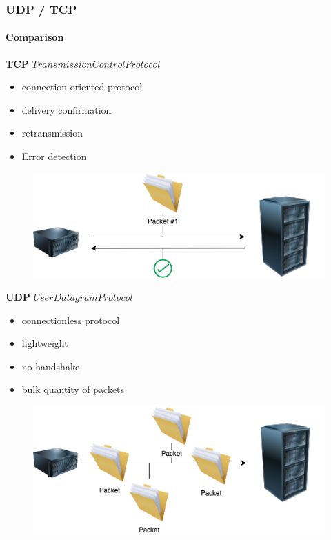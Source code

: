 \begin{frame}
    \frametitle{UDP / TCP}
    \framesubtitle{Comparison}
\centering
    \begin{minipage}[t]{0.49 \textwidth}
    	    	        	\textbf{TCP}\linebreak
    	    	        	 $Transmission Control Protocol$
    	        \begin{itemize}
    	        \item connection-oriented protocol
	    		\item delivery confirmation
	    		\item retransmission
	    		\item Error detection
    			\end{itemize}
        \begin{figure}[H]
            \centering
            \includegraphics[width = 1 \linewidth]{fig/UDP_TCP/TCP.png}
        \end{figure}
    \end{minipage}
    \begin{minipage}[t]{0.49 \textwidth}
    	    	    	        	\textbf{UDP}\linebreak
    	    	    	        	$User Datagram Protocol$
    	\begin{itemize} 
    		\item connectionless protocol
    		\item lightweight
    		\item no handshake
    		\item bulk quantity of packets
    	\end{itemize}
        \begin{figure}[H]
            \centering
            \includegraphics[width = 1 \linewidth]{fig/UDP_TCP/UDP.png}
        \end{figure}
        \end{minipage}
\end{frame}

